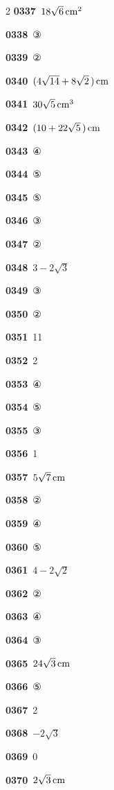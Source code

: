 \documentclass[10pt,a4paper]{article}
\begin{document}
\begin{multicols}{2}
\noindent\textbf{0337}\ $18\sqrt{6}\mkern3mu \mathrm{cm}^2$\par
\noindent\textbf{0338}\ ③\par
\noindent\textbf{0339}\ ②\par
\noindent\textbf{0340}\ $(4\sqrt{14}+8\sqrt{2}\mkern3mu )\mkern3mu \mathrm{cm}$\par
\noindent\textbf{0341}\ $30\sqrt{5}\mkern3mu \mathrm{cm}^3$\par
\noindent\textbf{0342}\ $(10+22\sqrt{5}\mkern3mu )\mkern3mu \mathrm{cm}$\par
\noindent\textbf{0343}\ ④\par
\noindent\textbf{0344}\ ⑤\par
\noindent\textbf{0345}\ ⑤\par
\noindent\textbf{0346}\ ③\par
\noindent\textbf{0347}\ ②\par
\noindent\textbf{0348}\ $3-2\sqrt{3}$\par
\noindent\textbf{0349}\ ③\par
\noindent\textbf{0350}\ ②\par
\noindent\textbf{0351}\ 11\par
\noindent\textbf{0352}\ 2\par
\noindent\textbf{0353}\ ④\par
\noindent\textbf{0354}\ ⑤\par
\noindent\textbf{0355}\ ③\par
\noindent\textbf{0356}\ 1\par
\noindent\textbf{0357}\ $5\sqrt{7}\mkern3mu \mathrm{cm}$\par
\noindent\textbf{0358}\ ②\par
\noindent\textbf{0359}\ ④\par
\noindent\textbf{0360}\ ⑤\par
\noindent\textbf{0361}\ $4-2\sqrt{2}$\par
\noindent\textbf{0362}\ ②\par
\noindent\textbf{0363}\ ④\par
\noindent\textbf{0364}\ ③\par
\noindent\textbf{0365}\ $24\sqrt{3}\mkern3mu \mathrm{cm}$\par
\noindent\textbf{0366}\ ⑤\par
\noindent\textbf{0367}\ 2\par
\noindent\textbf{0368}\ $-2\sqrt{3}$\par
\noindent\textbf{0369}\ 0\par
\noindent\textbf{0370}\ $2\sqrt{3}\mkern3mu \mathrm{cm}$\par

\end{multicols}
\end{document}
